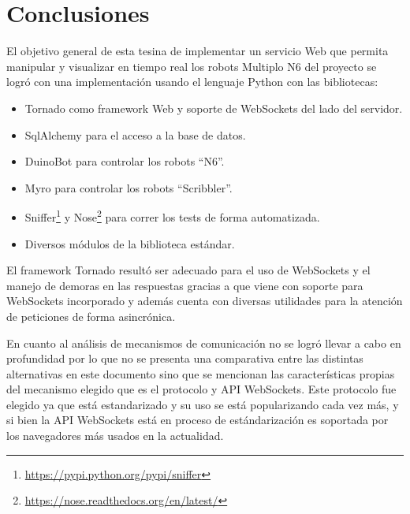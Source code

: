 
\chapter{Conclusiones}\label{cha:conclusiones}

%


El objetivo general de esta tesina de implementar un servicio Web que permita
manipular y visualizar en tiempo real los robots Multiplo N6 del proyecto
\proyecto{} se logró con una implementación usando el lenguaje Python con
las bibliotecas:

\begin{itemize}
    \item Tornado como framework Web y soporte de WebSockets del lado del
    servidor.
    \item SqlAlchemy para el acceso a la base de datos.
    \item DuinoBot para controlar los robots ``N6''.
    \item Myro para controlar los robots ``Scribbler''.
    \item Sniffer\footnote{\url{https://pypi.python.org/pypi/sniffer}} y
    Nose\footnote{\url{https://nose.readthedocs.org/en/latest/}} para correr
    los tests de forma automatizada.
    \item Diversos módulos de la biblioteca estándar.
\end{itemize}

El framework Tornado resultó ser adecuado para el uso de WebSockets y el manejo
de demoras en las respuestas gracias a que viene con soporte para WebSockets
incorporado y además cuenta con diversas utilidades para la atención de peticiones
de forma asincrónica.

En cuanto al análisis de mecanismos de comunicación no se logró llevar a cabo
en profundidad por lo que no se presenta una comparativa entre las distintas
alternativas en este documento sino que se mencionan las características propias
del mecanismo elegido que es el protocolo y API WebSockets. Este protocolo fue
elegido ya que está estandarizado y su uso se está popularizando cada vez más,
y si bien la API WebSockets está en proceso de estándarización es soportada
por los navegadores más usados en la actualidad.


